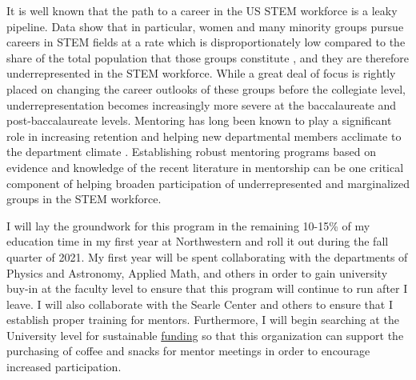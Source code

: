 \documentclass[aasms,11pt, longbibliography]{article}
\begin{document}
It is well known that the path to a career in the US STEM workforce is a leaky pipeline.
Data show that in particular, women and many minority groups pursue careers in STEM fields at a rate which is disproportionately low compared to the share of the total population that those groups constitute \citep{corbett&hill2015, nsf2019}, and they are therefore underrepresented in the STEM workforce.
While a great deal of focus is rightly placed on changing the career outlooks of these groups before the collegiate level, underrepresentation becomes increasingly more severe at the baccalaureate and post-baccalaureate levels.
Mentoring has long been known to play a significant role in increasing retention and helping new departmental members acclimate to the department climate \citep{hunt&michael1983}.
Establishing robust mentoring programs based on evidence and knowledge of the recent literature in mentorship \citep[as in e.g.,][]{crisp&all2009, crisp&all2017} can be one critical component of helping broaden participation of underrepresented and marginalized groups in the STEM workforce.

I will lay the groundwork for this program in the remaining 10-15\% of my education time in my first year at Northwestern and roll it out during the fall quarter of 2021.
My first year will be spent collaborating with the departments of Physics and Astronomy, Applied Math, and others in order to gain university buy-in at the faculty level to ensure that this program will continue to run after I leave.
I will also collaborate with the Searle Center and others to ensure that I establish proper training for mentors.
Furthermore, I will begin searching at the University level for sustainable \href{https://www.northwestern.edu/studentorgs/org-officers/funding/index.html}{funding} so that this organization can support the purchasing of coffee and snacks for mentor meetings in order to encourage increased participation.
\end{document}
